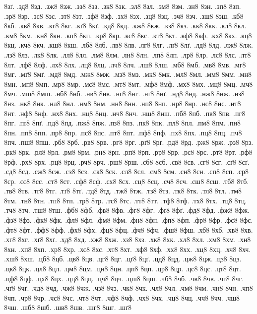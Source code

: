 {8зґ.
.зд8
8зд.
.зж8
8зж.
.зз8
8зз.
.зк8
8зк.
.зл8
8зл.
.зм8
8зм.
.зн8
8зн.
.зп8
8зп.
.зр8
8зр.
.зс8
8зс.
.зт8
8зт.
.зф8
8зф.
.зх8
8зх.
.зц8
8зц.
.зч8
8зч.
.зш8
8зш.
.кб8
8кб.
.кв8
8кв.
.кг8
8кг.
.кґ8
8кґ.
.кд8
8кд.
.кж8
8кж.
.кз8
8кз.
.кк8
8кк.
.кл8
8кл.
.км8
8км.
.кн8
8кн.
.кп8
8кп.
.кр8
8кр.
.кс8
8кс.
.кт8
8кт.
.кф8
8кф.
.кх8
8кх.
.кц8
8кц.
.кч8
8кч.
.кш8
8кш.
.лб8
8лб.
.лв8
8лв.
.лг8
8лг.
.лґ8
8лґ.
.лд8
8лд.
.лж8
8лж.
.лз8
8лз.
.лк8
8лк.
.лл8
8лл.
.лм8
8лм.
.лн8
8лн.
.лп8
8лп.
.лр8
8лр.
.лс8
8лс.
.лт8
8лт.
.лф8
8лф.
.лх8
8лх.
.лц8
8лц.
.лч8
8лч.
.лш8
8лш.
.мб8
8мб.
.мв8
8мв.
.мг8
8мг.
.мґ8
8мґ.
.мд8
8мд.
.мж8
8мж.
.мз8
8мз.
.мк8
8мк.
.мл8
8мл.
.мм8
8мм.
.мн8
8мн.
.мп8
8мп.
.мр8
8мр.
.мс8
8мс.
.мт8
8мт.
.мф8
8мф.
.мх8
8мх.
.мц8
8мц.
.мч8
8мч.
.мш8
8мш.
.нб8
8нб.
.нв8
8нв.
.нг8
8нг.
.нґ8
8нґ.
.нд8
8нд.
.нж8
8нж.
.нз8
8нз.
.нк8
8нк.
.нл8
8нл.
.нм8
8нм.
.нн8
8нн.
.нп8
8нп.
.нр8
8нр.
.нс8
8нс.
.нт8
8нт.
.нф8
8нф.
.нх8
8нх.
.нц8
8нц.
.нч8
8нч.
.нш8
8нш.
.пб8
8пб.
.пв8
8пв.
.пг8
8пг.
.пґ8
8пґ.
.пд8
8пд.
.пж8
8пж.
.пз8
8пз.
.пк8
8пк.
.пл8
8пл.
.пм8
8пм.
.пн8
8пн.
.пп8
8пп.
.пр8
8пр.
.пс8
8пс.
.пт8
8пт.
.пф8
8пф.
.пх8
8пх.
.пц8
8пц.
.пч8
8пч.
.пш8
8пш.
.рб8
8рб.
.рв8
8рв.
.рг8
8рг.
.рґ8
8рґ.
.рд8
8рд.
.рж8
8рж.
.рз8
8рз.
.рк8
8рк.
.рл8
8рл.
.рм8
8рм.
.рн8
8рн.
.рп8
8рп.
.рр8
8рр.
.рс8
8рс.
.рт8
8рт.
.рф8
8рф.
.рх8
8рх.
.рц8
8рц.
.рч8
8рч.
.рш8
8рш.
.сб8
8сб.
.св8
8св.
.сг8
8сг.
.сґ8
8сґ.
.сд8
8сд.
.сж8
8сж.
.сз8
8сз.
.ск8
8ск.
.сл8
8сл.
.см8
8см.
.сн8
8сн.
.сп8
8сп.
.ср8
8ср.
.сс8
8сс.
.ст8
8ст.
.сф8
8сф.
.сх8
8сх.
.сц8
8сц.
.сч8
8сч.
.сш8
8сш.
.тб8
8тб.
.тв8
8тв.
.тг8
8тг.
.тґ8
8тґ.
.тд8
8тд.
.тж8
8тж.
.тз8
8тз.
.тк8
8тк.
.тл8
8тл.
.тм8
8тм.
.тн8
8тн.
.тп8
8тп.
.тр8
8тр.
.тс8
8тс.
.тт8
8тт.
.тф8
8тф.
.тх8
8тх.
.тц8
8тц.
.тч8
8тч.
.тш8
8тш.
.фб8
8фб.
.фв8
8фв.
.фг8
8фг.
.фґ8
8фґ.
.фд8
8фд.
.фж8
8фж.
.фз8
8фз.
.фк8
8фк.
.фл8
8фл.
.фм8
8фм.
.фн8
8фн.
.фп8
8фп.
.фр8
8фр.
.фс8
8фс.
.фт8
8фт.
.фф8
8фф.
.фх8
8фх.
.фц8
8фц.
.фч8
8фч.
.фш8
8фш.
.хб8
8хб.
.хв8
8хв.
.хг8
8хг.
.хґ8
8хґ.
.хд8
8хд.
.хж8
8хж.
.хз8
8хз.
.хк8
8хк.
.хл8
8хл.
.хм8
8хм.
.хн8
8хн.
.хп8
8хп.
.хр8
8хр.
.хс8
8хс.
.хт8
8хт.
.хф8
8хф.
.хх8
8хх.
.хц8
8хц.
.хч8
8хч.
.хш8
8хш.
.цб8
8цб.
.цв8
8цв.
.цг8
8цг.
.цґ8
8цґ.
.цд8
8цд.
.цж8
8цж.
.цз8
8цз.
.цк8
8цк.
.цл8
8цл.
.цм8
8цм.
.цн8
8цн.
.цп8
8цп.
.цр8
8цр.
.цс8
8цс.
.цт8
8цт.
.цф8
8цф.
.цх8
8цх.
.цц8
8цц.
.цч8
8цч.
.цш8
8цш.
.чб8
8чб.
.чв8
8чв.
.чг8
8чг.
.чґ8
8чґ.
.чд8
8чд.
.чж8
8чж.
.чз8
8чз.
.чк8
8чк.
.чл8
8чл.
.чм8
8чм.
.чн8
8чн.
.чп8
8чп.
.чр8
8чр.
.чс8
8чс.
.чт8
8чт.
.чф8
8чф.
.чх8
8чх.
.чц8
8чц.
.чч8
8чч.
.чш8
8чш.
.шб8
8шб.
.шв8
8шв.
.шг8
8шг.
.шґ8
}
